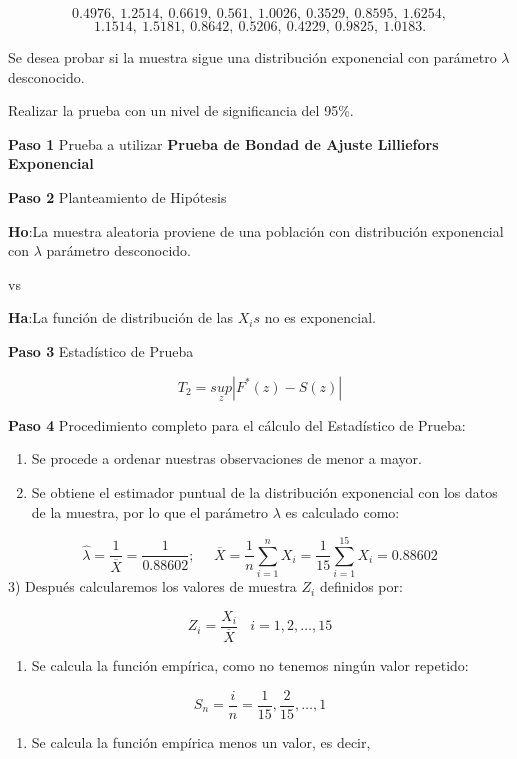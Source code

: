 \documentclass[a4paper,oneside,openany]{book}
\providecommand{\tightlist}{%
  \setlength{\itemsep}{0pt}\setlength{\parskip}{0pt}}
\begin{document}
\[0.4976,\ 1.2514,\ 0.6619,\ 0.561,\ 1.0026,\ 0.3529,\ 0.8595,\ 1.6254,\]
\[1.1514,\ 1.5181,\ 0.8642,\ 0.5206,\ 0.4229,\ 0.9825,\ 1.0183.\]

Se desea probar si la muestra sigue una distribución exponencial con
parámetro \(\lambda\) desconocido.

Realizar la prueba con un nivel de significancia del 95\%.

\textbf{Paso 1} Prueba a utilizar \textbf{Prueba de Bondad de Ajuste
Lilliefors Exponencial}

\textbf{Paso 2} Planteamiento de Hipótesis

\textbf{Ho}:La muestra aleatoria proviene de una población con
distribución exponencial con \(\lambda\) parámetro desconocido.

vs

\textbf{Ha}:La función de distribución de las \(X_{i}s\) no es
exponencial.

\textbf{Paso 3} Estadístico de Prueba

\[T_{2}=\underset{z}{sup}|F^*(z)-S(z)|\]

\textbf{Paso 4} Procedimiento completo para el cálculo del Estadístico
de Prueba:

\begin{enumerate}
\def\labelenumi{\arabic{enumi})}
\item
  Se procede a ordenar nuestras observaciones de menor a mayor.
\item
  Se obtiene el estimador puntual de la distribución exponencial con los
  datos de la muestra, por lo que el parámetro \(\lambda\) es calculado
  como:
\end{enumerate}

\[\hat{\lambda}=\frac{1}{\overline{X}}=\frac{1}{0.88602}; \ \ \ \ \ \  \overline{X}=\frac{1}{n}\sum_{i=1}^{n}X_{i}=\frac{1}{15}\sum_{i=1}^{15}X_{i}=0.88602\]
3) Después calcularemos los valores de muestra \(Z_{i}\) definidos por:

\[Z_{i}=\frac{X_{i}}{\overline{X}} \ \ \ \ i=1,2,\ldots,15\]

\begin{enumerate}
\def\labelenumi{\arabic{enumi})}
\setcounter{enumi}{3}
\tightlist
\item
  Se calcula la función empírica, como no tenemos ningún valor repetido:
\end{enumerate}

\[S_{n}= \frac{i}{n}=\frac{1}{15},\frac{2}{15}, \ldots, 1 \]

\begin{enumerate}
\def\labelenumi{\arabic{enumi})}
\setcounter{enumi}{4}
\tightlist
\item
  Se calcula la función empírica menos un valor, es decir,
\end{enumerate}
\end{document}
